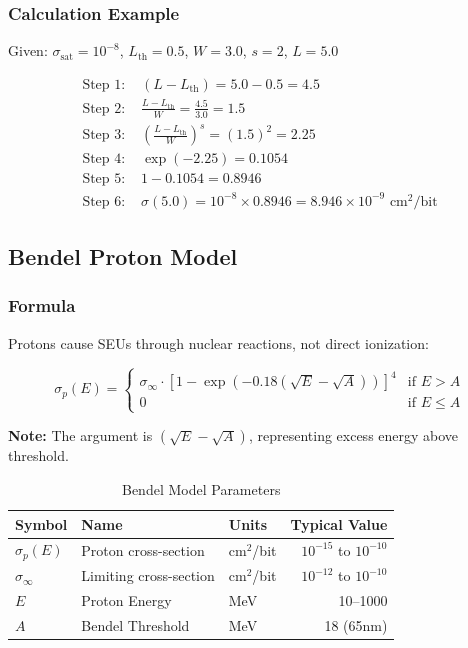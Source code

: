 \documentclass[11pt,a4paper]{article}
\begin{document}
\subsubsection{Calculation Example}

Given: $\sigma_{\text{sat}} = 10^{-8}$, $L_{\text{th}} = 0.5$, $W = 3.0$, $s = 2$, $L = 5.0$

\begin{align}
\text{Step 1: } & (L - L_{\text{th}}) = 5.0 - 0.5 = 4.5 \\
\text{Step 2: } & \frac{L - L_{\text{th}}}{W} = \frac{4.5}{3.0} = 1.5 \\
\text{Step 3: } & \left(\frac{L - L_{\text{th}}}{W}\right)^s = (1.5)^2 = 2.25 \\
\text{Step 4: } & \exp(-2.25) = 0.1054 \\
\text{Step 5: } & 1 - 0.1054 = 0.8946 \\
\text{Step 6: } & \sigma(5.0) = 10^{-8} \times 0.8946 = 8.946 \times 10^{-9} \text{ cm}^2/\text{bit}
\end{align}

\subsection{Bendel Proton Model}

\subsubsection{Formula}

Protons cause SEUs through nuclear reactions, not direct ionization:

\begin{equation}
\sigma_p(E) = \begin{cases}
\sigma_\infty \cdot \left[1 - \exp\left(-0.18\left(\sqrt{E} - \sqrt{A}\right)\right)\right]^4 & \text{if } E > A \\
0 & \text{if } E \leq A
\end{cases}
\end{equation}

\textbf{Note:} The argument is $(\sqrt{E} - \sqrt{A})$, representing excess energy above threshold.

\begin{table}[htbp]
\centering
\caption{Bendel Model Parameters}
\begin{tabular}{@{}lllr@{}}
\toprule
\textbf{Symbol} & \textbf{Name} & \textbf{Units} & \textbf{Typical Value} \\ \midrule
$\sigma_p(E)$ & Proton cross-section & cm$^2$/bit & $10^{-15}$ to $10^{-10}$ \\
$\sigma_\infty$ & Limiting cross-section & cm$^2$/bit & $10^{-12}$ to $10^{-10}$ \\
$E$ & Proton Energy & MeV & 10--1000 \\
$A$ & Bendel Threshold & MeV & 18 (65nm) \\ \bottomrule
\end{tabular}
\end{table}
\end{document}
